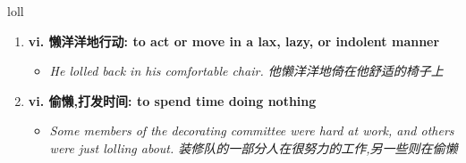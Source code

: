 
\begin{frame}
{\huge loll}
\begin{center}
\begin{enumerate}\Large
  \item \textbf{vi. 懒洋洋地行动: to act or move in a lax, lazy, or indolent manner}
  \begin{itemize}
    \item \em{\Large{He lolled back in his comfortable chair. 他懒洋洋地倚在他舒适的椅子上}}
  \end{itemize}
  \item \textbf{vi. 偷懒,打发时间: to spend time doing nothing}
  \begin{itemize}
    \item \em{\Large{Some members of the decorating committee were hard at work, and others were just lolling about. 装修队的一部分人在很努力的工作,另一些则在偷懒}}
  \end{itemize}
\end{enumerate}
\end{center}
\end{frame}
